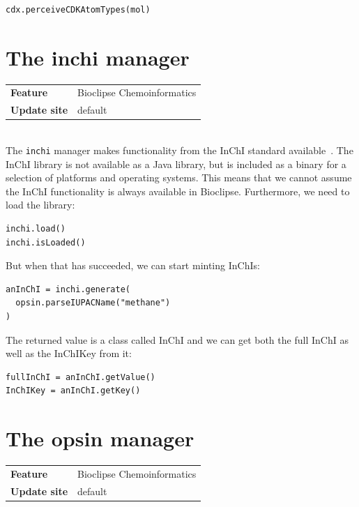 \documentclass[a5paper, 10pt]{memoir}
\begin{document}
\begin{refsection}
\begin{Verbatim}
cdx.perceiveCDKAtomTypes(mol)
\end{Verbatim}

\section{The inchi manager}

\begin{tabular}{ll}
\textbf{Feature} & Bioclipse Chemoinformatics \\
\textbf{Update site} & default \\
\end{tabular} \\

\noindent
The \texttt{inchi} manager makes functionality from the InChI
standard available~\cite{heller2013inchi,spjuth2013applications}.
The InChI library is not available as a Java library, but is included as a
binary for a selection of platforms and operating systems. This means that we
cannot assume the InChI functionality is always available in Bioclipse.
Furthermore, we need to load the library:

\begin{Verbatim}
inchi.load()
inchi.isLoaded()
\end{Verbatim}
But when that has succeeded, we can start minting InChIs:

\begin{Verbatim}
anInChI = inchi.generate(
  opsin.parseIUPACName("methane")
)
\end{Verbatim}
The returned value is a class called InChI and we can get both the full InChI
as well as the InChIKey from it:

\begin{Verbatim}
fullInChI = anInChI.getValue()
InChIKey = anInChI.getKey()
\end{Verbatim}

\section{The opsin manager}

\begin{tabular}{ll}
\textbf{Feature} & Bioclipse Chemoinformatics \\
\textbf{Update site} & default \\
\end{tabular} \\


\end{refsection}
\end{document}
